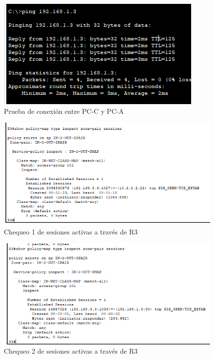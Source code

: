 \documentclass[11pt]{article}
\begin{document}
        \clearpage
        \begin{figure}[!h]
            \centering
            \includegraphics[scale=0.9]{img/part6-step1.png}
            \caption{Prueba de conexión entre PC-C y PC-A}
            \label{fig:part6-step1}
        \end{figure}

        \begin{figure}[!h]
            \centering
            \includegraphics[scale=0.8]{img/part6-step2.png}
            \caption{Chequeo 1 de sesiones activas a través de R3}
            \label{fig:part6-step2}
        \end{figure}

        \clearpage
        \begin{figure}[!h]
            \centering
            \includegraphics[scale=0.8]{img/part6-step4.png}
            \caption{Chequeo 2 de sesiones activas a través de R3}
            \label{fig:part6-step4}
        \end{figure}
\end{document}
